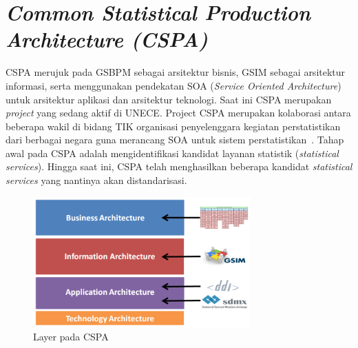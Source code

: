 \section{\textit{Common Statistical Production Architecture (CSPA)}}
CSPA merujuk pada GSBPM sebagai arsitektur bisnis, GSIM sebagai arsitektur informasi, serta menggunakan pendekatan SOA (\textit{Service Oriented Architecture}) untuk arsitektur aplikasi dan arsitektur teknologi. Saat ini CSPA merupakan \textit{project} yang sedang aktif di UNECE. Project CSPA merupakan kolaborasi antara beberapa wakil di bidang TIK organisasi penyelenggara kegiatan perstatistikan dari berbagai negara guna merancang SOA untuk sistem perstatistikan~\cite{_cspa_????}. Tahap awal pada CSPA adalah mengidentifikasi kandidat layanan statistik (\textit{statistical services}). Hingga saat ini, CSPA telah menghasilkan beberapa kandidat \textit{statistical services} yang nantinya akan distandarisasi.

\begin{figure}[h]
    \centering
    \includegraphics[height=5cm]{../../Resources/Images/cspa-layer}
    \caption{Layer pada CSPA}
    \label{fig:cspa-layer}
\end{figure}

